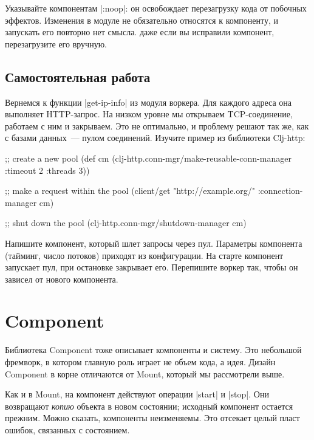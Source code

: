 Указывайте компонентам \spverb|:noop|: он освобождает перезагрузку кода от
побочных эффектов. Изменения в модуле не обязательно относятся к компоненту, и
запускать его повторно нет смысла. даже если вы исправили компонент,
перезагрузите его вручную.

\subsection{Самостоятельная работа}

Вернемся к функции \spverb|get-ip-info| из модуля воркера. Для каждого адреса
она выполняет HTTP-запрос. На низком уровне мы открываем TCP-соединение,
работаем с ним и закрываем. Это не оптимально, и проблему решают так же, как с
базами данных~--- пулом соединений. Изучите пример из библиотеки
Clj-http:

\begin{english}
  \begin{clojure}
;; create a new pool
(def cm (clj-http.conn-mgr/make-reusable-conn-manager
         {:timeout 2 :threads 3}))

;; make a request within the pool
(client/get "http://example.org/"
            {:connection-manager cm})

;; shut down the pool
(clj-http.conn-mgr/shutdown-manager cm)
  \end{clojure}
\end{english}

Напишите компонент, который шлет запросы через пул. Параметры компонента
(тайминг, число потоков) приходят из конфигурации. На старте компонент запускает
пул, при остановке закрывает его. Перепишите воркер так, чтобы он зависел от
нового компонента.

\section{Component}

Библиотека Component тоже
описывает компоненты и систему. Это небольшой фремворк, в котором главную роль
играет не объем кода, а идея. Дизайн Component в корне отличаются от Mount,
который мы рассмотрели выше.

Как и в Mount, на компонент действуют операции \spverb|start| и
\spverb|stop|. Они возвращают \emph{копию} объекта в новом состоянии; исходный
компонент остается прежним. Можно сказать, компоненты неизменяемы. Это отсекает
целый пласт ошибок, связанных с состоянием.

